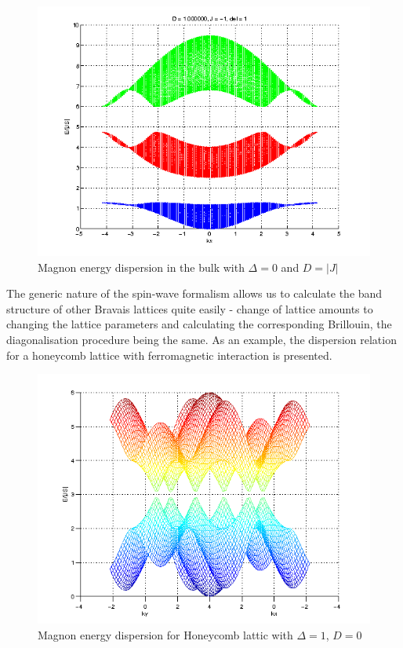 \begin{figure}
    \centering
    \includegraphics[scale=0.5]{latex_plots/mook.png}
    \caption{Magnon energy dispersion in the bulk with $\Delta = 0$ and $D=|J|$}
\end{figure}
The generic nature of the spin-wave formalism allows us to calculate the band structure of other Bravais lattices quite easily - change of lattice amounts to changing the lattice parameters and calculating the corresponding Brillouin, the diagonalisation procedure being the same. As an example, the dispersion relation for a honeycomb lattice with ferromagnetic interaction is presented\cite{owerre_honeycomb_magnon}.
\begin{figure}[!h]
    \centering
    \includegraphics[scale=0.4]{latex_plots/honeycomb_spectrum_mesh_size_3969.png}
    \caption{Magnon energy dispersion for Honeycomb lattic with $\Delta = 1$, $D=0$}
\end{figure}
\setcounter{equation}{0}
\setcounter{table}{0}
\setcounter{figure}{0}


    



